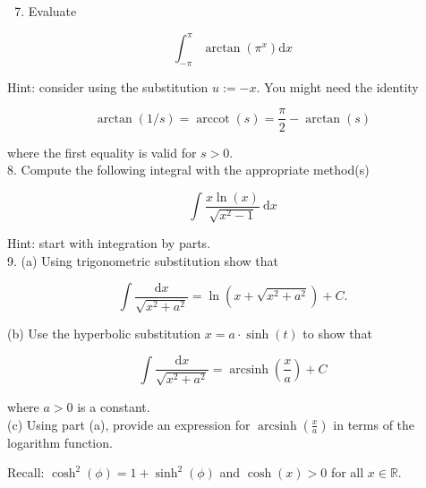 \documentclass[10pt]{article}
\begin{document}
\begin{enumerate}
  \setcounter{enumi}{6}
  \item Evaluate
\end{enumerate}

$$
\int_{-\pi}^{\pi} \arctan \left(\pi^{x}\right) \mathrm{d} x
$$

Hint: consider using the substitution $u:=-x$. You might need the identity

$$
\arctan (1 / s)=\operatorname{arccot}(s)=\frac{\pi}{2}-\arctan (s)
$$

where the first equality is valid for $s>0$.\\
8. Compute the following integral with the appropriate method(s)

$$
\int \frac{x \ln (x)}{\sqrt{x^{2}-1}} \mathrm{~d} x
$$

Hint: start with integration by parts.\\
9. (a) Using trigonometric substitution show that

$$
\int \frac{\mathrm{d} x}{\sqrt{x^{2}+a^{2}}}=\ln \left(x+\sqrt{x^{2}+a^{2}}\right)+C .
$$

(b) Use the hyperbolic substitution $x=a \cdot \sinh (t)$ to show that

$$
\int \frac{\mathrm{d} x}{\sqrt{x^{2}+a^{2}}}=\operatorname{arcsinh}\left(\frac{x}{a}\right)+C
$$

where $a>0$ is a constant.\\
(c) Using part (a), provide an expression for $\operatorname{arcsinh}\left(\frac{x}{a}\right)$ in terms of the logarithm function.

Recall: $\cosh ^{2}(\phi)=1+\sinh ^{2}(\phi)$ and $\cosh (x)>0$ for all $x \in \mathbb{R}$.
\end{document}
